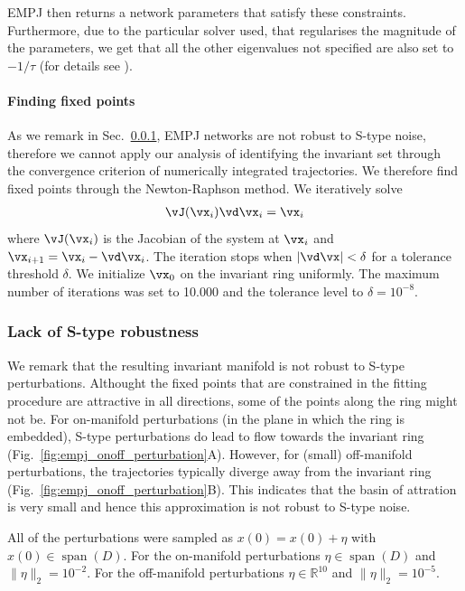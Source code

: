 \documentclass{article} %
\newcounter{ct}
\newcommand{\reals}{\mathbb{R}}
\theoremstyle{definition}
\theoremstyle{remark}
\begin{document}
EMPJ then returns a network parameters that satisfy these constraints. Furthermore, due to the particular solver used, that regularises the magnitude of the parameters, we get that all the other eigenvalues not specified are also set to $-1/\tau$ (for details see \citep{pollock2020}).


\paragraph{Finding fixed points}
As we remark in Sec.~\ref{sec:empjnonrobust}, EMPJ networks are not robust to S-type noise, therefore we cannot apply our analysis of identifying the invariant set through the convergence criterion of numerically integrated trajectories.
We therefore find fixed points through the Newton-Raphson method.
We iteratively solve
\begin{align}
 \vJ(\vx_i)\vd\vx_i = \vx_i
\end{align}
where \(\vJ(\vx_i)\) is the Jacobian of the system at \(\vx_i\) and \(\vx_{i+1}=\vx_i-\vd\vx_i\).
The iteration stops when $|\vd\vx|<\delta$ for a tolerance threshold $\delta$.
We initialize \(\vx_0\) on the invariant ring uniformly.
The maximum number of iterations was set to 10.000 and the tolerance level to $\delta=10^{-8}$.

\subsubsection{Lack of S-type robustness}\label{sec:empjnonrobust}
We remark that the resulting invariant manifold is not robust to S-type perturbations.
Althought the fixed points that are constrained in the fitting procedure are attractive in all directions, some of the points along the ring might not be.
For on-manifold perturbations (in the plane in which the ring is embedded), S-type perturbations do lead to flow towards the invariant ring (Fig.~\ref{fig:empj_onoff_perturbation}A).
However, for (small) off-manifold perturbations, the trajectories typically diverge away from the invariant ring (Fig.~\ref{fig:empj_onoff_perturbation}B).
This indicates that the basin of attration is very small and hence this approximation is not robust to S-type noise.


All of the perturbations were sampled as
\(x(0) = x(0) + \eta\) with \(x(0)\in \operatorname{span}(D)\).
For the on-manifold perturbations \(\eta\in \operatorname{span}(D)\)  and \(\|\eta\|_2=10^{-2}\).
For the off-manifold perturbations \(\eta\in \reals^{10}\) and \(\|\eta\|_2=10^{-5}\).
\end{document}
